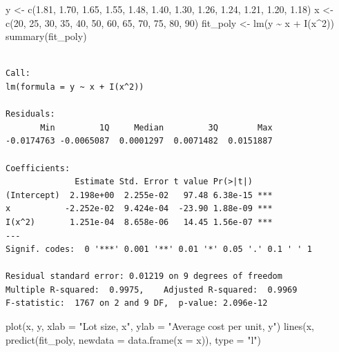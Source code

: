 \documentclass[
  letterpaper,
  DIV=11,
  numbers=noendperiod]{scrreprt}
\newenvironment{Shaded}{\begin{snugshade}}{\end{snugshade}}
\newcommand{\AttributeTok}[1]{\textcolor[rgb]{0.40,0.45,0.13}{#1}}
\newcommand{\DecValTok}[1]{\textcolor[rgb]{0.68,0.00,0.00}{#1}}
\newcommand{\FloatTok}[1]{\textcolor[rgb]{0.68,0.00,0.00}{#1}}
\newcommand{\FunctionTok}[1]{\textcolor[rgb]{0.28,0.35,0.67}{#1}}
\newcommand{\NormalTok}[1]{\textcolor[rgb]{0.00,0.23,0.31}{#1}}
\newcommand{\OtherTok}[1]{\textcolor[rgb]{0.00,0.23,0.31}{#1}}
\newcommand{\SpecialCharTok}[1]{\textcolor[rgb]{0.37,0.37,0.37}{#1}}
\newcommand{\StringTok}[1]{\textcolor[rgb]{0.13,0.47,0.30}{#1}}
\begin{document}
\begin{Shaded}
\begin{Highlighting}[]
\NormalTok{y }\OtherTok{\textless{}{-}} \FunctionTok{c}\NormalTok{(}\FloatTok{1.81}\NormalTok{, }\FloatTok{1.70}\NormalTok{, }\FloatTok{1.65}\NormalTok{, }\FloatTok{1.55}\NormalTok{, }\FloatTok{1.48}\NormalTok{, }\FloatTok{1.40}\NormalTok{, }\FloatTok{1.30}\NormalTok{, }\FloatTok{1.26}\NormalTok{, }\FloatTok{1.24}\NormalTok{, }\FloatTok{1.21}\NormalTok{, }\FloatTok{1.20}\NormalTok{, }\FloatTok{1.18}\NormalTok{)}
\NormalTok{x }\OtherTok{\textless{}{-}} \FunctionTok{c}\NormalTok{(}\DecValTok{20}\NormalTok{, }\DecValTok{25}\NormalTok{, }\DecValTok{30}\NormalTok{, }\DecValTok{35}\NormalTok{, }\DecValTok{40}\NormalTok{, }\DecValTok{50}\NormalTok{, }\DecValTok{60}\NormalTok{, }\DecValTok{65}\NormalTok{, }\DecValTok{70}\NormalTok{, }\DecValTok{75}\NormalTok{, }\DecValTok{80}\NormalTok{, }\DecValTok{90}\NormalTok{)}
\NormalTok{fit\_poly }\OtherTok{\textless{}{-}} \FunctionTok{lm}\NormalTok{(y }\SpecialCharTok{\textasciitilde{}}\NormalTok{ x }\SpecialCharTok{+} \FunctionTok{I}\NormalTok{(x}\SpecialCharTok{\^{}}\DecValTok{2}\NormalTok{))}
\FunctionTok{summary}\NormalTok{(fit\_poly)}
\end{Highlighting}
\end{Shaded}

\begin{verbatim}

Call:
lm(formula = y ~ x + I(x^2))

Residuals:
       Min         1Q     Median         3Q        Max 
-0.0174763 -0.0065087  0.0001297  0.0071482  0.0151887 

Coefficients:
              Estimate Std. Error t value Pr(>|t|)    
(Intercept)  2.198e+00  2.255e-02   97.48 6.38e-15 ***
x           -2.252e-02  9.424e-04  -23.90 1.88e-09 ***
I(x^2)       1.251e-04  8.658e-06   14.45 1.56e-07 ***
---
Signif. codes:  0 '***' 0.001 '**' 0.01 '*' 0.05 '.' 0.1 ' ' 1

Residual standard error: 0.01219 on 9 degrees of freedom
Multiple R-squared:  0.9975,    Adjusted R-squared:  0.9969 
F-statistic:  1767 on 2 and 9 DF,  p-value: 2.096e-12
\end{verbatim}

\begin{Shaded}
\begin{Highlighting}[]
\FunctionTok{plot}\NormalTok{(x, y, }\AttributeTok{xlab =} \StringTok{"Lot size, x"}\NormalTok{, }\AttributeTok{ylab =} \StringTok{"Average cost per unit, y"}\NormalTok{)}
\FunctionTok{lines}\NormalTok{(x, }\FunctionTok{predict}\NormalTok{(fit\_poly, }\AttributeTok{newdata =} \FunctionTok{data.frame}\NormalTok{(}\AttributeTok{x =}\NormalTok{ x)), }\AttributeTok{type =} \StringTok{"l"}\NormalTok{)}
\end{Highlighting}
\end{Shaded}
\end{document}
